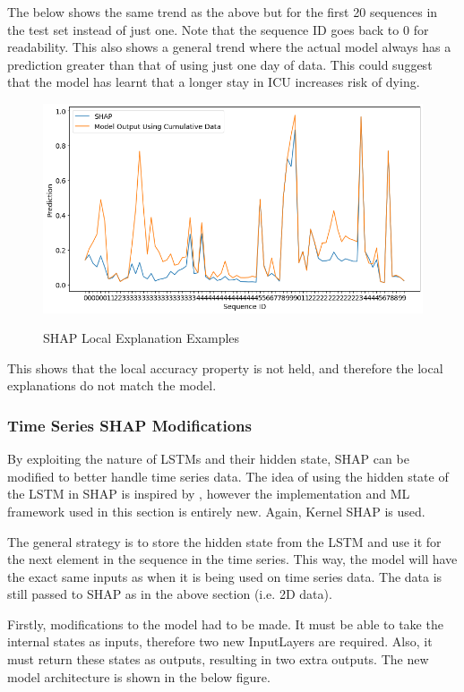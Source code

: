 \documentclass[12pt]{article}
\begin{document}
The below shows the same trend as the above but for the first 20 sequences in the test set instead of just one. Note that the sequence ID goes back to 0 for readability. This also shows a general trend where the actual model always has a prediction greater than that of using just one day of data. This could suggest that the model has learnt that a longer stay in ICU increases risk of dying.

\begin{figure}[H]
\centering\caption{SHAP Local Explanation Examples}
\includegraphics[scale=0.5]{Vanilla SHAP local2.png}
\label{SHAP Local Explanation Examples}
\end{figure}

This shows that the local accuracy property is not held, and therefore the local explanations do not match the model.

\subsubsection{Time Series SHAP Modifications}

By exploiting the nature of LSTMs and their hidden state, SHAP can be modified to better handle time series data. The idea of using the hidden state of the LSTM in SHAP is inspired by \cite{TimeSeriesSHAP}, however the implementation and ML framework used in this section is entirely new. Again, Kernel SHAP is used.

The general strategy is to store the hidden state from the LSTM and use it for the next element in the sequence in the time series. This way, the model will have the exact same inputs as when it is being used on time series data. The data is still passed to SHAP as in the above section (i.e. 2D data).

Firstly, modifications to the model had to be made. It must be able to take the internal states as inputs, therefore two new InputLayers are required. Also, it must return these states as outputs, resulting in two extra outputs. The new model architecture is shown in the below figure.
\end{document}
